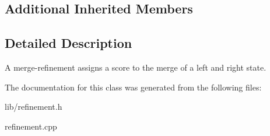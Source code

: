 \subsection*{Additional Inherited Members}


\subsection{Detailed Description}
A merge-\/refinement assigns a score to the merge of a left and right state. 

The documentation for this class was generated from the following files\+:\begin{DoxyCompactItemize}
\item 
lib/refinement.\+h\item 
refinement.\+cpp\end{DoxyCompactItemize}
